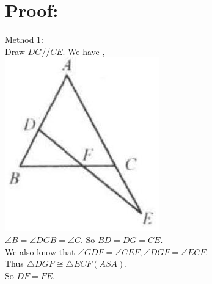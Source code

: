 \documentclass[10pt]{article}
\begin{document}
\section*{Proof:}
Method 1:\\
Draw \(D G / / C E\). We have ,\\
\includegraphics[max width=\textwidth, center]{2025_04_17_97bc1f7e44d93c271a88g-102}\\
\(\angle B=\angle D G B=\angle C\). So \(B D=D G=C E\).\\
We also know that \(\angle G D F=\angle C E F, \angle D G F=\angle E C F\).\\
Thus \(\triangle D G F \cong \triangle E C F(A S A)\).\\
So \(D F=F E\).\\
\end{document}
